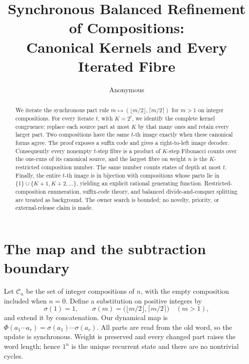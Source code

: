 \documentclass[10pt,a4paper]{amsart}
\title[Balanced refinement of compositions]{Synchronous Balanced Refinement of Compositions:\\
Canonical Kernels and Every Iterated Fibre}
\author{Anonymous}
\date{}
\theoremstyle{definition}
\theoremstyle{remark}
\newcommand{\Comp}{\mathcal C}
\begin{document}
\begin{abstract}
We iterate the synchronous part rule
$m\mapsto(\lfloor m/2\rfloor,\lceil m/2\rceil)$ for $m>1$ on integer
compositions.  For every iterate $t$, with
$K=2^t$, we identify the complete kernel congruence: replace each source
part at most $K$ by that many ones and retain every larger part.  Two
compositions have the same $t$-th image exactly when these canonical forms
agree.  The proof exposes a suffix code and gives a right-to-left image
decoder.  Consequently every nonempty $t$-step fibre is a product of
$K$-step Fibonacci counts over the one-runs of its canonical source, and
the largest fibre on weight $n$ is the $K$-restricted composition number.
The same number counts states of depth at most $t$.  Finally, the entire
$t$-th image is in bijection with compositions whose parts lie in
$\{1\}\cup\{K+1,K+2,\ldots\}$, yielding an explicit rational generating
function.  Restricted-composition enumeration, suffix-code theory, and
balanced divide-and-conquer splitting are treated as background.  The owner
search is bounded; no novelty, priority, or external-release claim is made.
\end{abstract}

\maketitle

\section{The map and the subtraction boundary}

Let $\Comp_n$ be the set of integer compositions of $n$, with the empty
composition included when $n=0$.  Define a substitution on positive
integers by
\begin{equation}
 \sigma(1)=1,
 \qquad
 \sigma(m)=\bigl(\lfloor m/2\rfloor,\lceil m/2\rceil\bigr)
 \quad(m>1),                                             \label{eq:map}
\end{equation}
and extend it by concatenation.  Our dynamical map is
$\Phi(a_1\cdots a_r)=\sigma(a_1)\cdots\sigma(a_r)$.
All parts are read from the old word, so the update is synchronous.  Weight
is preserved and every changed part raises the word length; hence $1^n$ is
the unique recurrent state and there are no nontrivial cycles.
\end{document}
